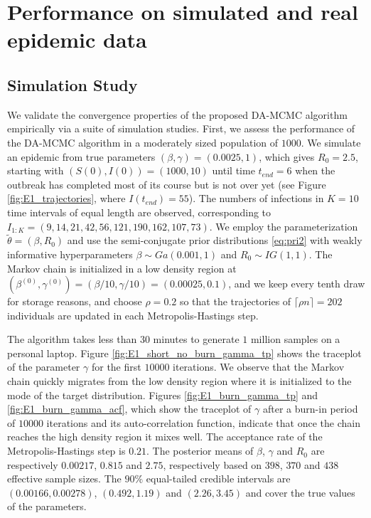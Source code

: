 \documentclass[11pt]{article}
\begin{document}
	
	\section{Performance on simulated and real epidemic data}
	\label{sec:per}
	
	\subsection{Simulation Study}
	\label{sec:sim}
	
	We validate the convergence properties of the proposed DA-MCMC algorithm empirically via a suite of simulation studies. First, we assess the performance of the DA-MCMC algorithm in a moderately sized population of $1000$. We simulate an epidemic from true parameters $(\beta, \gamma) = (0.0025, 1)$, which gives $R_0 = 2.5$, starting with $(S(0), I(0)) = (1000, 10)$ until time $t_{end} = 6$ when the outbreak has completed most of its course but is not over yet (see Figure \ref{fig:E1_trajectories}, where $I(t_{end}) = 55$). The numbers of infections in $K = 10$ time intervals of equal length are observed, corresponding to $I_{1:K} = (9, 14, 21, 42, 56, 121, 190, 162, 107, 73)$.	
	We employ the parameterization $\tilde{\theta} = (\beta, R_0)$ and use the semi-conjugate prior distributions \eqref{eq:pri2} with weakly informative hyperparameters $\beta \sim Ga(0.001, 1)$ and $R_0 \sim IG(1,1)$.
	The Markov chain is initialized in a low density region at $(\beta^{(0)}, \gamma^{(0)}) = (\beta/10, \gamma/10) = (0.00025, 0.1)$, and we keep every tenth draw for storage reasons, and choose $\rho = 0.2$ so that the trajectories of $\lceil\rho n\rceil = 202$ individuals are updated in each Metropolis-Hastings step. 
	
	The algorithm takes less than $30$ minutes to generate $1$ million samples on a personal laptop. 
	Figure \ref{fig:E1_short_no_burn_gamma_tp} shows the traceplot of the parameter $\gamma$ for the first $10000$ iterations. We observe that the Markov chain quickly migrates from the low density region where it is initialized to the mode of the target distribution. Figures  \ref{fig:E1_burn_gamma_tp} and \ref{fig:E1_burn_gamma_acf}, which show the traceplot of $\gamma$ after a burn-in period of $10000$ iterations and its auto-correlation function, indicate that once the chain reaches the high density region it mixes well. The acceptance rate of the Metropolis-Hastings step is $0.21$.
	The posterior means of $\beta$, $\gamma$ and $R_0$ are respectively $0.00217$, $0.815$ and $2.75$, respectively based on $398$, $370$ and $438$ effective sample sizes. The $90\%$ equal-tailed credible intervals are $(0.00166, 0.00278)$, $(0.492, 1.19)$ and $(2.26, 3.45)$ and cover the true values of the parameters. 
	
\end{document}
